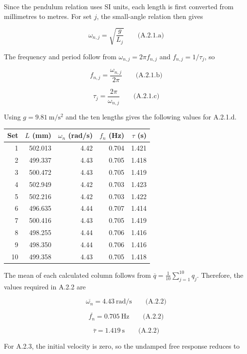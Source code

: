 Since the pendulum relation uses SI units, each length is first converted from millimetres to metres. For set \(j\), the small-angle relation then gives

\[\boxed{\omega_{n,j}=\sqrt{\frac{g}{L_j}}}\qquad\text{(A.2.1.a)}\]

The frequency and period follow from \(\omega_{n,j}=2\pi f_{n,j}\) and \(f_{n,j}=1/\tau_j\), so

\[\boxed{f_{n,j}=\frac{\omega_{n,j}}{2\pi}}\qquad\text{(A.2.1.b)}\]

\[\boxed{\tau_j=\frac{2\pi}{\omega_{n,j}}}\qquad\text{(A.2.1.c)}\]

Using \(g=9.81\ \mathrm{m/s^2}\) and the ten lengths gives the following values for A.2.1.d.

{ %
\begin{center}\small\begin{tabular}{@{}rrrrr@{}}
\toprule\noalign{}
Set & \(L\) (mm) & \(\omega_n\) (rad/s) & \(f_n\) (Hz) & \(\tau\) (s) \\
\midrule\noalign{}
1 & 502.013 & 4.42 & 0.704 & 1.421 \\
2 & 499.337 & 4.43 & 0.705 & 1.418 \\
3 & 500.472 & 4.43 & 0.705 & 1.419 \\
4 & 502.949 & 4.42 & 0.703 & 1.423 \\
5 & 502.216 & 4.42 & 0.703 & 1.422 \\
6 & 496.635 & 4.44 & 0.707 & 1.414 \\
7 & 500.416 & 4.43 & 0.705 & 1.419 \\
8 & 498.255 & 4.44 & 0.706 & 1.416 \\
9 & 498.350 & 4.44 & 0.706 & 1.416 \\
10 & 499.358 & 4.43 & 0.705 & 1.418 \\
\bottomrule\end{tabular}\end{center}
}

The mean of each calculated column follows from \(\overline{q}=\frac{1}{10}\sum_{j=1}^{10}q_j\). Therefore, the values required in A.2.2 are

\[\boxed{\overline{\omega_n}=4.43\ \mathrm{rad/s}}\qquad\text{(A.2.2)}\]

\[\boxed{\overline{f_n}=0.705\ \mathrm{Hz}}\qquad\text{(A.2.2)}\]

\[\boxed{\overline{\tau}=1.419\ \mathrm{s}}\qquad\text{(A.2.2)}\]

For A.2.3, the initial velocity is zero, so the undamped free response reduces to


